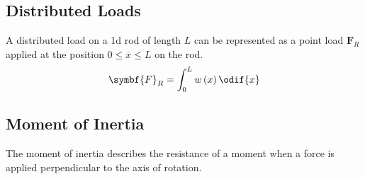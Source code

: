 \documentclass{article}
\begin{document}
\subsection{Distributed Loads}
A distributed load on a 1d rod of length \(L\) can be represented as a point load \(\symbf{F}_R\) applied at the position \(0 \leq \overline{x} \leq L\) on the rod.
\begin{equation*}
    \symbf{F}_R = \int_0^L w\left( x \right) \odif{x}
\end{equation*}
\subsection{Moment of Inertia}
The moment of inertia describes the resistance of a moment when a force is applied perpendicular to the axis
of rotation.
\end{document}
